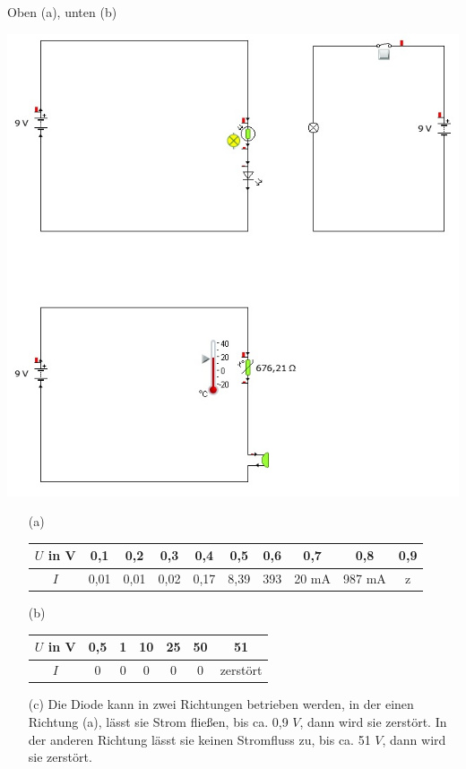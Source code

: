 \begin{Loesung}
Oben (a), unten (b)
\begin{center}
\includegraphics[width=.7\textwidth]{pics/loessimu}
\end{center}
\end{Loesung}



\begin{Loesung}
\hfill \par \vspace*{-.7cm}
\begin{itemize}
\item[(a)] 
\begin{tabular}{|c|c|c|c|c|c|c|c|c|c|}
\hline
$U$ in V & 0,1 & 0,2 & 0,3 & 0,4 & 0,5 & 0,6 & 0,7 & 0,8 & 0,9 \\ \hline
$I$ & 0,01 & 0,01 & 0,02 & 0,17 & 8,39 & 393 & 20 mA & 987 mA & z \\ \hline
\end{tabular}
\item[(b)] 
\begin{tabular}{|c|c|c|c|c|c|c|}
\hline
$U$ in V & 0,5 & 1 & 10 & 25 & 50 & 51  \\ \hline
$I$ &0&0&0&0&0& zerstört \\ \hline
\end{tabular}
\item[(c)] Die Diode kann in zwei Richtungen betrieben werden, in der einen Richtung (a), lässt sie Strom fließen, bis ca. 0,9 $V$, dann wird sie zerstört.
In der anderen Richtung lässt sie keinen Stromfluss zu, bis ca. 51 $V$, dann wird sie zerstört.
\end{itemize}

\end{Loesung}




